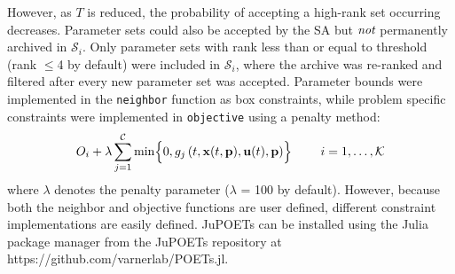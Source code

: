 \documentclass{bmcart}
\begin{document}
However, as $T$ is reduced, the probability of accepting a high-rank set occurring decreases.
Parameter sets could also be accepted by the SA but $\emph{not}$ permanently archived in $\mathcal{S}_{i}$.
Only parameter sets with rank less than or equal to threshold (rank $\leq$4 by default) were included in $\mathcal{S}_{i}$, where the archive was re-ranked and filtered after
every new parameter set was accepted.
Parameter bounds were implemented in the \texttt{neighbor} function as box constraints, while problem specific constraints were implemented in \texttt{objective} using a penalty method:
\begin{equation}
  O_{i}+\lambda\sum_{j=1}^{\mathcal{C}}\min\Bigl\{0,g_j\left(t,\mathbf{x}(t,\mathbf{p}),\mathbf{u}(t),\mathbf{p}\right)\Bigr\}\qquad~i=1,\hdots,\mathcal{K}
\end{equation}where $\lambda$ denotes the penalty parameter ($\lambda$ = 100 by default).
However, because both the neighbor and objective functions are user defined, different constraint implementations are easily defined.
JuPOETs can be installed using the Julia package manager from the JuPOETs repository at https://github.com/varnerlab/POETs.jl.
\end{document}
